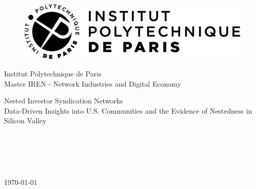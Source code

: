 \begin{figure}[t]
\includegraphics[width=0.7\columnwidth]{../figures/ipparis-logo.png}
\centering
\end{figure}

\begin{titlepage}
\begin{center}
Institut Polytechnique de Paris \\
Master IREN - Network Industries and Digital Economy \\
\vspace{44pt}

\huge Nested Investor Syndication Networks\\
\large Data-Driven Insights into U.S. Communities and the Evidence of Nestedness in Silicon Valley\\
\vspace{44pt}

\normalsize
{}\\  
\vspace{74pt}

\begin{center}
    \\ 
    \\   
\end{center}

\vspace{\fill}
\today \\
\end{center}
\end{titlepage}


\pagebreak
